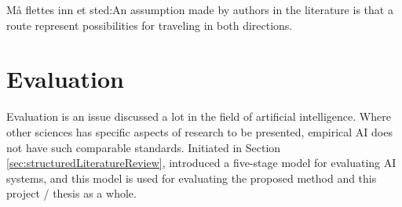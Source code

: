 Må flettes inn et sted:An assumption made by authors in the literature is that a route represent possibilities for traveling in both directions.

\section{Evaluation}


Evaluation is an issue discussed a lot in the field of artificial intelligence. Where other sciences has specific aspects of research to be presented, empirical AI does not have such comparable standards. Initiated in Section \vref{sec:structuredLiteratureReview},  \citet{cohen88} introduced a five-stage model for evaluating AI systems, and this model is used for evaluating the proposed method and this project / thesis as a whole. %

